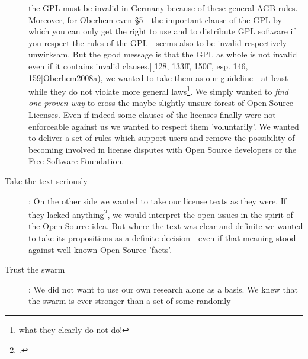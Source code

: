 \begin{description}
  the GPL must be invalid in Germany because of these general AGB rules.
  Moreover, for Oberhem even §5 - the important clause of the GPL by which you
  can only get the right to use and to distribute GPL software if you respect
  the rules of the GPL - seems also to be invalid respectively
  \glqq{}unwirksam\grqq{}. But the good message is that the GPL as whole is not
  invalid even if it contains invalid clauses.][128, 133ff, 150ff, esp. 146,
  159]{Oberhem2008a}), we wanted to take them as our guideline - at least while
  they do not violate more general laws\footnote{what they clearly do not do!}.
  We simply wanted to \emph{find one proven way} to cross the maybe slightly
  unsure forest of Open Source Licenses. Even if indeed some clauses of the
  licenses finally were not enforceable against us we wanted to respect them
  'voluntarily'. We wanted to deliver a set of rules which support users and
  remove the possibility of becoming involved in license disputes with Open
  Source developers or the Free Software Foundation.
  \item[Take the text seriously]: On the other side we wanted to take our
  license texts as they were. If they lacked anything\footcite[The systematical
  underdetermination of licenses is a problem being also known in the Open
  Source respectively Free Software movement. Following the biography of RMS his
  main judicial councelor Moglen has stated, that \glqq{}there is uncertainty in
  every legal process (\ldots) \grqq{} and that it seemed to be silly to try
  \glqq{}(\ldots) to take out all the bugs (\ldots)\grqq{}. Nevertheless - so
  Moglen resp. Williams - the goal of Richard Stallman was \glqq{}the complete
  opposite\grqq{}: He tried \glqq{}(\ldots) to remove uncertainty which is
  inherently impossible\grqq{}. But - and that's the nub of this analysis -
  Moglen had to follow Stallmann because of RMS character. And he had to
  summarize their work so, that \glqq{}(\ldots) the resulting elegance (of the
  GPL; KR.), the resulting simplicity (of the GPL; KR.) in design almost
  achieves what it has to achieve\grqq{}. Hence we are asked to take the license
  texts themselves seriously. cf.][177f]{Williams2002a}, we would interpret the
  open issues in the spirit of the Open Source idea. But where the text was
  clear and definite we wanted to take its propositions as a definite decision -
  even if that meaning stood against well known Open Source 'facts'.
  \item[Trust the swarm]: We did not want to use our own research alone as a
  basis. We knew that the swarm is ever stronger than a set of some randomly

\end{description}
